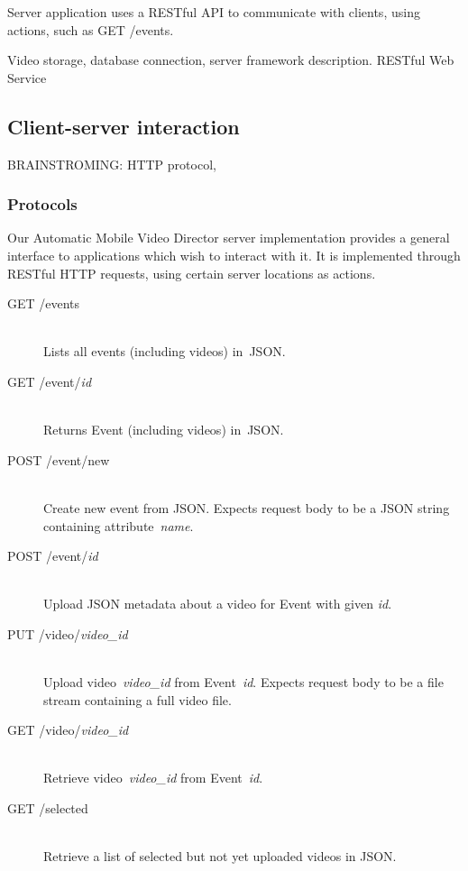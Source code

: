\documentclass[conference]{IEEEtran}
\begin{document}
Server application uses a RESTful API to communicate with clients, using actions, such as GET /events.

Video storage, database connection, server framework description. RESTful Web Service


\subsection{Client-server interaction}
BRAINSTROMING: HTTP protocol, 

\subsubsection{Protocols}
Our Automatic Mobile Video Director server implementation provides 
a general interface to applications which wish to interact with it. 
It is implemented through RESTful HTTP requests, using certain server locations as actions.

\begin{description}
	\item[GET /events]\hfill\\
		Lists all events (including videos) in~JSON.
		
	\item[GET /event/\textit{id}]\hfill\\
		Returns Event (including videos) in~JSON.
				
	\item[POST /event/new]\hfill\\
		Create new event from JSON.
		Expects request body to be a JSON string containing attribute~\textit{name}.
		
	\item[POST /event/\textit{id}]\hfill\\
		Upload JSON metadata about a video for Event with given \textit{id}.
		
	\item[PUT /video/\textit{video\_id}]\hfill\\
		Upload video~\textit{video\_id} from Event~\textit{id}.
		Expects request body to be a file stream containing a full video file.
		
	\item[GET /video/\textit{video\_id}]\hfill\\
		Retrieve video~\textit{video\_id} from Event~\textit{id}.
		
	\item[GET /selected]\hfill\\
		Retrieve a list of selected but not yet uploaded videos in JSON.	
		
\end{description}
\end{document}
